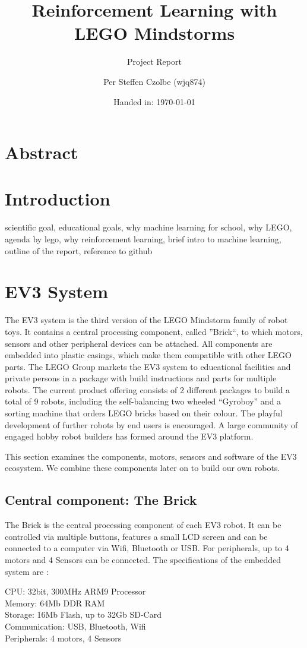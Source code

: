 \documentclass[11pt, a4paper]{article}
\author{Per Steffen Czolbe (wjq874)}
\title{Reinforcement Learning with LEGO Mindstorms}
\subtitle{Project Report}
\date{Handed in: \today}
\begin{document}
\maketitle

\section{Abstract}

\tableofcontents


\section{Introduction}
scientific goal,
educational goals,
why machine learning for school,
why LEGO,
agenda by lego,
why reinforcement learning,
brief intro to machine learning,
outline of the report,
reference to github

\section{EV3 System}
The EV3 system is the third version of the LEGO Mindstorm family of robot toys. It contains a central processing component, called ''Brick``, to which motors, sensors and other peripheral devices can be attached. All components are embedded into plastic casings, which make them compatible with other LEGO parts. The LEGO Group markets the EV3 system to educational facilities and private persons in a package with build instructions and parts for multiple robots. The current product offering consists of 2 different packages to build a total of 9 robots, including the self-balancing two wheeled ``Gyroboy'' and a sorting machine that orders LEGO bricks based on their colour. The playful development of further robots by end users is encouraged. A large community of engaged hobby robot builders has formed around the EV3 platform.

This section examines the components, motors, sensors and software of the EV3 ecosystem. We combine these components later on to build our own robots.

\subsection{Central component: The Brick}
The Brick is the central processing component of each EV3 robot. It can be controlled via multiple buttons, features a small LCD screen and can be connected to a computer via Wifi, Bluetooth or USB. For peripherals, up to 4 motors and 4 Sensors can be connected. The specifications of the embedded system are \cite{ev3_dev_toolkit}:
\begin{listing}
	CPU: 32bit, 300MHz ARM9 Processor \\
	Memory: 64Mb DDR RAM\\
	Storage: 16Mb Flash, up to 32Gb SD-Card \\
	Communication: USB, Bluetooth, Wifi \\
	Peripherals: 4 motors, 4 Sensors
\end{listing}
\end{document}
